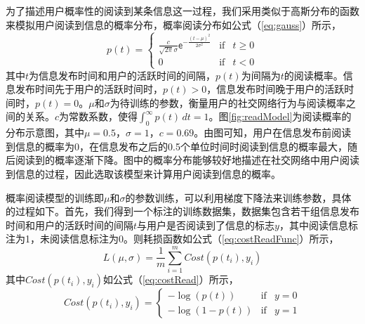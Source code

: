为了描述用户概率性的阅读到某条信息这一过程，我们采用类似于高斯分布的函数来模拟用户阅读到信息的概率分布，概率阅读分布如公式（\ref{eq:gauss}）所示，
\begin{equation}
\label{eq:gauss}
	p\left(t\right) = \left\{ \begin{array}{rcl} \frac{c}{\sqrt{2 \pi} \sigma}\mathsf{e}^{-\frac{\left(t-\mu\right)^2}{2{\sigma}^2}} & \mbox{if} & t \geq 0 \\ 0 & \mbox{if} & t < 0  \end{array} \right.
\end{equation}
其中$t$为信息发布时间和用户的活跃时间的间隔，$p\left(t\right)$为间隔为$t$的阅读概率。信息发布时间先于用户的活跃时间时，$p\left(t\right) > 0$，信息发布时间晚于用户的活跃时间时，$p\left(t\right) = 0$。$\mu$和$\sigma$为待训练的参数，衡量用户的社交网络行为与阅读概率之间的关系。$c$为常数系数，使得$\int _0^\infty p\left(t\right) \,dt = 1$。图\ref{fig:readModel}为阅读概率的分布示意图，其中$\mu = 0.5$，$\sigma = 1$，$c = 0.69$。由图可知，用户在信息发布前阅读到信息的概率为0，在信息发布之后的0.5个单位时间时阅读到信息的概率最大，随后阅读到的概率逐渐下降。图中的概率分布能够较好地描述在社交网络中用户阅读到信息的过程，因此选取该模型来计算用户阅读到信息的概率。

概率阅读模型的训练即$\mu$和$\sigma$的参数训练，可以利用梯度下降法来训练参数，具体的过程如下。首先，我们得到一个标注的训练数据集，数据集包含若干组信息发布时间和用户的活跃时间的间隔$t$与用户是否阅读到了信息的标志$y$，其中阅读信息标注为1，未阅读信息标注为0。则耗损函数如公式（\ref{eq:costReadFunc}）所示，
\begin{equation}
\label{eq:costReadFunc}
	L\left(\mu, \sigma \right) = \frac{1}{m}\sum_{i=1}^m {Cost\left( p\left(t_i\right), y_i\right)}
\end{equation}
其中$Cost\left( p\left(t_i\right), y_i\right)$如公式（\ref{eq:costRead}）所示，
\begin{equation}
\label{eq:costRead}
	Cost\left( p\left(t_i\right), y_i\right) = \left\{ \begin{array}{rcl} -\log \left(p\left(t\right)\right) & \mbox{if} & y=0 \\ -\log \left(1 - p\left(t\right) \right) & \mbox{if} & y=1  \end{array} \right.
\end{equation}

